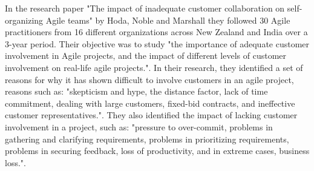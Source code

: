 In the research paper "The impact of inadequate customer collaboration on self-organizing Agile teams" by Hoda, Noble and Marshall \cite{Hoda2011TheIO} they followed 30 Agile practitioners from 16 different organizations across New Zealand and India over a 3-year period. Their objective was to study "the importance of adequate customer involvement in Agile projects, and the impact of different levels of customer involvement on real-life agile projects.\cite{Hoda2011TheIO}". In their research, they identified a set of reasons for why it has shown difficult to involve customers in an agile project, reasons such as: "skepticism and hype, the distance factor, lack of time commitment, dealing with large customers, fixed-bid contracts, and ineffective customer representatives.\cite{Hoda2011TheIO}". They also identified the impact of lacking customer involvement in a project, such as: "pressure to over-commit, problems in gathering and clarifying requirements, problems in prioritizing requirements, problems in securing feedback, loss of productivity, and in extreme cases, business loss.\cite{Hoda2011TheIO}".

